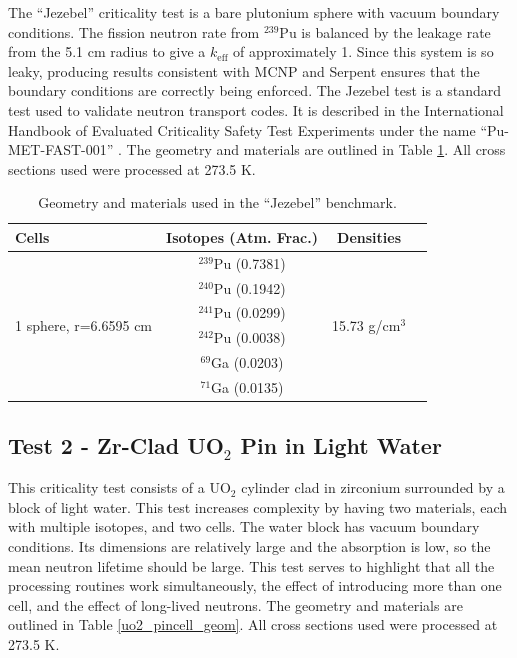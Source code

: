 \documentclass[preprint,12pt]{elsarticle}
\begin{document}
The ``Jezebel'' criticality test is a bare plutonium sphere with vacuum boundary conditions.   The fission neutron rate from $^{239}$Pu is balanced by the leakage rate from the 5.1 cm radius to give a $k_\mathrm{eff}$ of approximately 1.  Since this system is so leaky, producing results consistent with MCNP and Serpent ensures that the boundary conditions are correctly being enforced.  The Jezebel test is a standard test used to validate neutron transport codes.  It is described in the International Handbook of Evaluated Criticality Safety Test Experiments under the name ``Pu-MET-FAST-001'' \cite{bench_handbook}.  The geometry and materials are outlined in Table \ref{jezebel_geom}.  All cross sections used were processed at 273.5 K.

\begin{table}[h]
\centering
\caption{Geometry and materials used in the ``Jezebel'' benchmark.}
\label{jezebel_geom}
\begin{tabular}{| l | c | c | c |}
\hline
Cells & Isotopes (Atm. Frac.)& Densities \\
\hline
\multirow{6}{*}{1 sphere, r=6.6595 cm }  &  $^{239}$Pu (0.7381) &    \multirow{6}{*}{15.73 g/cm$^3$} \\
                                         &  $^{240}$Pu (0.1942)    & \\
                                         &  $^{241}$Pu (0.0299)    & \\
                                         &  $^{242}$Pu (0.0038)    & \\
                                         &  $^{69}$Ga  (0.0203)    & \\
                                         &  $^{71}$Ga  (0.0135)     & \\ 
\hline
\end{tabular}
\end{table}

\subsection{Test 2 - Zr-Clad UO$_2$ Pin in Light Water}

This criticality test consists of a UO$_2$ cylinder clad in zirconium surrounded by a block of light water.  This test increases complexity by having two materials, each with multiple isotopes, and two cells.  The water block has vacuum boundary conditions.  Its dimensions are relatively large and the absorption is low, so the mean neutron lifetime should be large.  This test serves to highlight that all the processing routines work simultaneously, the effect of introducing more than one cell, and the effect of long-lived neutrons.  The geometry and materials are outlined in Table \ref{uo2_pincell_geom}.  All cross sections used were processed at 273.5 K.
\end{document}
